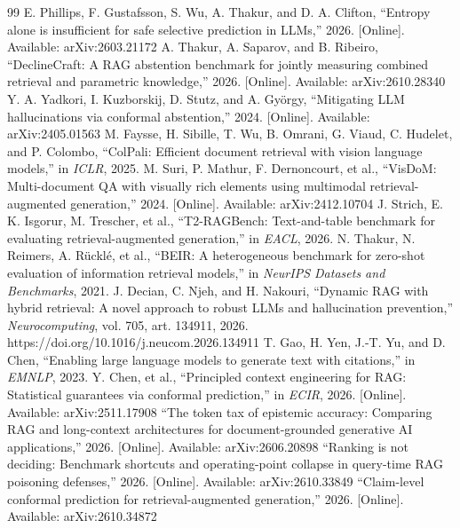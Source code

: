 \documentclass[preprint,3p,times]{elsarticle}
\begin{document}
\begin{thebibliography}{99}
 E. Phillips, F. Gustafsson, S. Wu, A. Thakur, and D. A. Clifton, ``Entropy alone is insufficient for safe selective prediction in LLMs,'' 2026. [Online]. Available: arXiv:2603.21172
 A. Thakur, A. Saparov, and B. Ribeiro, ``DeclineCraft: A RAG abstention benchmark for jointly measuring combined retrieval and parametric knowledge,'' 2026. [Online]. Available: arXiv:2610.28340
 Y. A. Yadkori, I. Kuzborskij, D. Stutz, and A. Gy\"orgy, ``Mitigating LLM hallucinations via conformal abstention,'' 2024. [Online]. Available: arXiv:2405.01563
 M. Faysse, H. Sibille, T. Wu, B. Omrani, G. Viaud, C. Hudelet, and P. Colombo, ``ColPali: Efficient document retrieval with vision language models,'' in \emph{ICLR}, 2025.
 M. Suri, P. Mathur, F. Dernoncourt, et al., ``VisDoM: Multi-document QA with visually rich elements using multimodal retrieval-augmented generation,'' 2024. [Online]. Available: arXiv:2412.10704
 J. Strich, E. K. Isgorur, M. Trescher, et al., ``T2-RAGBench: Text-and-table benchmark for evaluating retrieval-augmented generation,'' in \emph{EACL}, 2026.
 N. Thakur, N. Reimers, A. R\"uckl\'e, et al., ``BEIR: A heterogeneous benchmark for zero-shot evaluation of information retrieval models,'' in \emph{NeurIPS Datasets and Benchmarks}, 2021.
 J. Decian, C. Njeh, and H. Nakouri, ``Dynamic RAG with hybrid retrieval: A novel approach to robust LLMs and hallucination prevention,'' \emph{Neurocomputing}, vol. 705, art. 134911, 2026. https://doi.org/10.1016/j.neucom.2026.134911
 T. Gao, H. Yen, J.-T. Yu, and D. Chen, ``Enabling large language models to generate text with citations,'' in \emph{EMNLP}, 2023.
 Y. Chen, et al., ``Principled context engineering for RAG: Statistical guarantees via conformal prediction,'' in \emph{ECIR}, 2026. [Online]. Available: arXiv:2511.17908
 ``The token tax of epistemic accuracy: Comparing RAG and long-context architectures for document-grounded generative AI applications,'' 2026. [Online]. Available: arXiv:2606.20898
 ``Ranking is not deciding: Benchmark shortcuts and operating-point collapse in query-time RAG poisoning defenses,'' 2026. [Online]. Available: arXiv:2610.33849
 ``Claim-level conformal prediction for retrieval-augmented generation,'' 2026. [Online]. Available: arXiv:2610.34872

\end{thebibliography}
\end{document}
